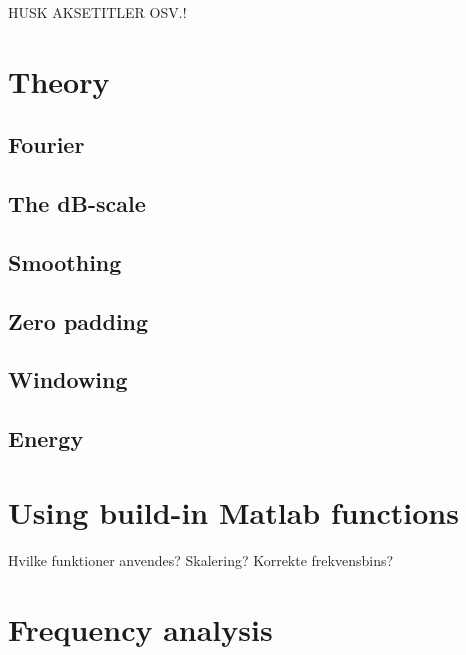 HUSK AKSETITLER OSV.!
	
\section{Theory}
\subsection{Fourier}

\subsection{The dB-scale}

\subsection{Smoothing}

\subsection{Zero padding}

\subsection{Windowing}

\subsection{Energy}

\section{Using build-in Matlab functions}
Hvilke funktioner anvendes?
Skalering?
Korrekte frekvensbins?

\section{Frequency analysis}
